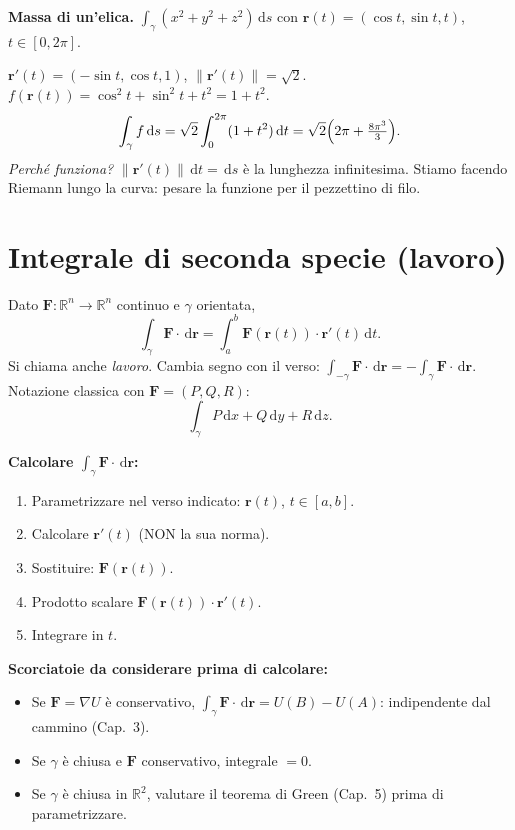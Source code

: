 \documentclass[11pt,a4paper,openany]{book}
\theoremstyle{plain}
\theoremstyle{definition}
\theoremstyle{remark}
\newcommand{\R}{\mathbb{R}}
\newcommand{\dd}{\,\mathrm{d}}
\newcommand{\F}{\mathbf{F}}
\newcommand{\rr}{\mathbf{r}}
\newcommand{\norm}[1]{\left\lVert #1 \right\rVert}
\begin{document}
\begin{esempio}
\textbf{Massa di un'elica.} $\int_\gamma(x^2+y^2+z^2)\dd s$ con
$\rr(t)=(\cos t,\sin t,t)$, $t\in[0,2\pi]$.

$\rr'(t)=(-\sin t,\cos t,1)$, $\norm{\rr'(t)}=\sqrt{2}$.
$f(\rr(t))=\cos^2 t+\sin^2 t+t^2=1+t^2$.
\[
  \int_\gamma f\dd s=\sqrt{2}\int_0^{2\pi}(1+t^2)\dd t
  =\sqrt{2}\Bigl(2\pi+\tfrac{8\pi^3}{3}\Bigr).
\]
\textsl{Perch\'e funziona?} $\norm{\rr'(t)}\dd t=\dd s$ \`e la lunghezza
infinitesima. Stiamo facendo Riemann lungo la curva: pesare la funzione per il
pezzettino di filo.
\end{esempio}

\section{Integrale di seconda specie (lavoro)}

Dato $\F:\R^n\to\R^n$ continuo e $\gamma$ orientata,
\begin{equation}
  \int_\gamma\F\cdot\dd\rr=\int_a^b\F(\rr(t))\cdot\rr'(t)\dd t.
  \label{eq:int-seconda}
\end{equation}
Si chiama anche \emph{lavoro}. Cambia segno con il verso:
$\int_{-\gamma}\F\cdot\dd\rr=-\int_\gamma\F\cdot\dd\rr$. Notazione classica
con $\F=(P,Q,R)$:
\[
  \int_\gamma P\dd x+Q\dd y+R\dd z.
\]

\begin{ricetta}
\textbf{Calcolare $\int_\gamma\F\cdot\dd\rr$:}
\begin{enumerate}[leftmargin=*]
  \item Parametrizzare nel verso indicato: $\rr(t)$, $t\in[a,b]$.
  \item Calcolare $\rr'(t)$ (NON la sua norma).
  \item Sostituire: $\F(\rr(t))$.
  \item Prodotto scalare $\F(\rr(t))\cdot\rr'(t)$.
  \item Integrare in $t$.
\end{enumerate}
\textbf{Scorciatoie da considerare prima di calcolare:}
\begin{itemize}[leftmargin=*]
  \item Se $\F=\nabla U$ \`e conservativo, $\int_\gamma\F\cdot\dd\rr=U(B)-U(A)$:
        indipendente dal cammino (Cap.~3).
  \item Se $\gamma$ \`e chiusa e $\F$ conservativo, integrale $=0$.
  \item Se $\gamma$ \`e chiusa in $\R^2$, valutare il teorema di Green
        (Cap.~5) prima di parametrizzare.
\end{itemize}
\end{ricetta}
\end{document}
